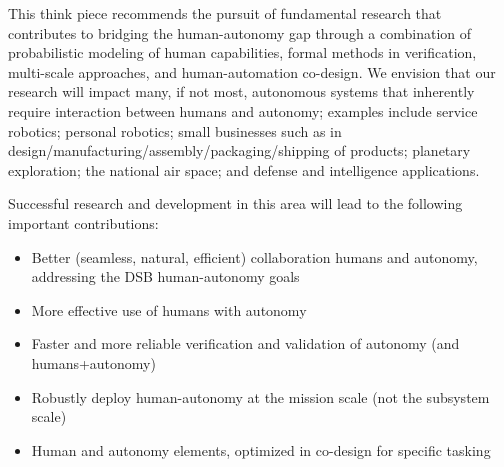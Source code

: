 This think piece recommends the pursuit of fundamental research that contributes to bridging the human-autonomy gap through a combination of probabilistic modeling of human capabilities, formal methods in verification, multi-scale approaches, and human-automation co-design. We envision that our research will impact many, if not most, autonomous systems that inherently require interaction between humans and autonomy; examples include service robotics; personal robotics; small businesses such as in design/manufacturing/assembly/packaging/shipping of products; planetary exploration; the national air space; and defense and intelligence applications. 


Successful research and development in this area will lead to the following important contributions:\vspace*{-0.1 in}
\begin{itemize}
\item Better (seamless, natural, efficient) collaboration humans and autonomy, addressing the DSB human-autonomy goals\vspace*{-0.1 in}
\item More effective use of humans with autonomy\vspace*{-0.1 in}
\item Faster and more reliable verification and validation of autonomy (and humans+autonomy)\vspace*{-0.1 in}
\item Robustly deploy human-autonomy at the mission scale (not the subsystem scale)\vspace*{-0.1 in}
\item Human and autonomy elements, optimized in co-design for specific tasking\vspace*{-0.1 in}
\end{itemize}

 \\
 \\

